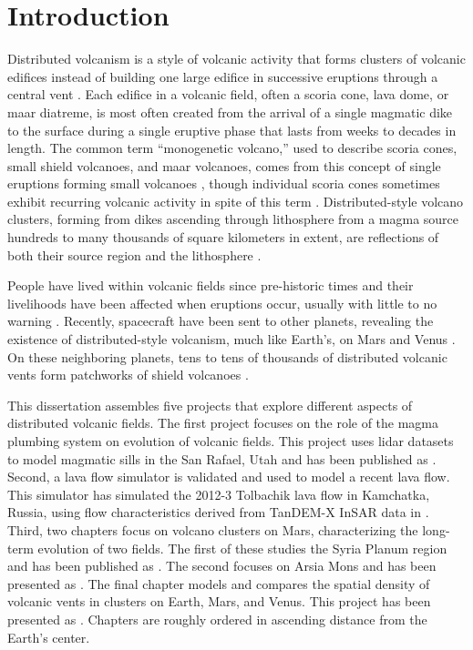 \chapter[Introduction]{Introduction}

Distributed volcanism is a style of volcanic activity that forms clusters of volcanic edifices instead of building one large edifice in successive eruptions through a central vent \citep{valentine2000basaltic}. Each edifice in a volcanic field, often a scoria cone, lava dome, or maar diatreme, is most often created from the arrival of a single magmatic dike to the surface during a single eruptive phase that lasts from weeks to decades in length. The common term ``monogenetic volcano,'' used to describe scoria cones, small shield volcanoes, and maar volcanoes, comes from this concept of single eruptions forming small volcanoes \citep{greeley1977basaltic}, though individual scoria cones sometimes exhibit recurring volcanic activity in spite of this term \citep{hill1998cerro}. Distributed-style volcano clusters, forming from dikes ascending through lithosphere from a magma source hundreds to many thousands of square kilometers in extent, are reflections of both their source region and the lithosphere \citep{settle1979structure}.

People have lived within volcanic fields since pre-historic times and their livelihoods have been affected when eruptions occur, usually with little to no warning \citep{elson2007living}. Recently, spacecraft have been sent to other planets, revealing the existence of distributed-style volcanism, much like Earth's, on Mars \citep{Carr1977} and Venus \citep{head1992venus}. On these neighboring planets, tens to tens of thousands of distributed volcanic vents form patchworks of shield volcanoes \citep{richardson2013volcanic,miller2012shield}. 

This dissertation assembles five projects that explore different aspects of distributed volcanic fields. The first project focuses on the role of the magma plumbing system on evolution of volcanic fields. This project uses lidar datasets to model magmatic sills in the San Rafael, Utah and has been published as \citet{richardson2015sills}. Second, a lava flow simulator is validated and used to model a recent lava flow. This simulator has simulated the 2012-3 Tolbachik lava flow in Kamchatka, Russia, using flow characteristics derived from TanDEM-X InSAR data in \citet{kubanek2015lava}. Third, two chapters focus on volcano clusters on Mars, characterizing the long-term evolution of two fields. The first of these studies the Syria Planum region and has been published as \citet{richardson2013volcanic}. The second focuses on Arsia Mons and has been presented as \citet{richardson2015recurrence}. The final chapter models and compares the spatial density of volcanic vents in clusters on Earth, Mars, and Venus. This project has been presented as \citet{richardson2012comparison}. Chapters are roughly ordered in ascending distance from the Earth's center. 

